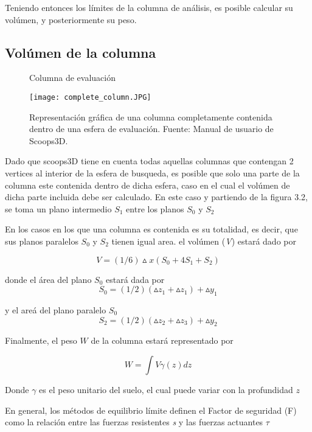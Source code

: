 Teniendo entonces los l\'imites de la columna de an\'alisis, es posible calcular su vol\'umen, y posteriormente su peso.

\subsection{Vol\'umen de la columna}



\begin{figure}[h]
\caption{Columna de evaluaci\'on}
\centering
\texttt{[image: complete\_column.JPG]}
\caption{Representaci\'on gr\'afica de una columna completamente contenida dentro de una esfera de evaluaci\'on. Fuente: Manual de usuario de Scoops3D. \cite{columngraph}  }
\label{fig:failure-plane}
\end{figure}

Dado que scoops3D tiene en cuenta todas aquellas columnas que contengan 2 vertices al interior de la esfera de busqueda, es posible que solo una parte de la columna este contenida dentro de dicha esfera, caso en el cual el vol\'umen de dicha parte incluida debe ser calculado.
En este caso y partiendo de la figura 3.2, se toma un plano intermedio $ S_{1} $ entre los planos $ S_{0} $ y $ S_{2} $

En los casos en los que una columna es contenida es su totalidad, es decir, que sus planos  paralelos $S_{0}$ y $S_{2}$ tienen igual area. el vol\'umen (\textit{V}) estar\'a dado por 

$$\textit{V}= (1/6)\vartriangle \textit{x}(S_{0} + 4S_{1} + S_{2})$$

donde el \'area del plano $\textit{S}_{0}$ estar\'a dada por
$$ \textit{S}_{0} = (1/2)(\vartriangle z_{1} +\vartriangle z_{1})+\vartriangle \textit{y}_{1}  $$

y el are\'a del plano paralelo $\textit{S}_{0}$
$$ \textit{S}_{2} = (1/2)(\vartriangle z_{2} +\vartriangle z_{3})+\vartriangle \textit{y}_{2}  $$

Finalmente, el peso $W$ de la columna estar\'a representado por

$$\textit{W} = \int \textit{V} \gamma (\textit{z}) \textit{dz} $$

Donde $ \gamma$ es el peso unitario del suelo, el cual puede variar con la profundidad $\textit{z}$

En general, los m\'etodos de equilibrio l\'imite definen el Factor de seguridad (F) como la relaci\'on entre las fuerzas resistentes  \textit{s} y las fuerzas actuantes $\tau$

